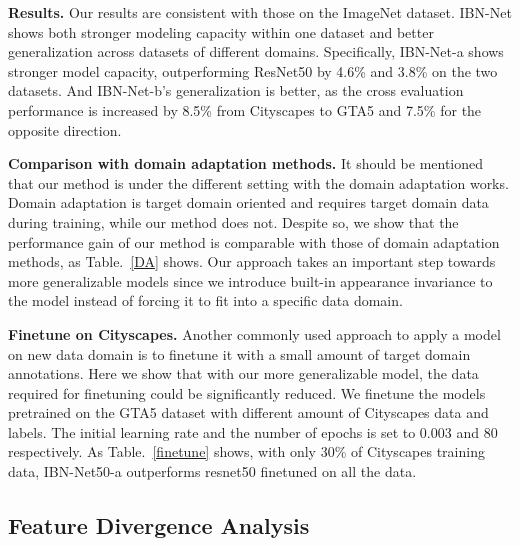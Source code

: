 \documentclass[runningheads]{llncs}
\begin{document}
\textbf{Results.} 
Our results are consistent with those on the ImageNet dataset.
IBN-Net shows both stronger modeling capacity within one dataset and better generalization across datasets of different domains.
Specifically, IBN-Net-a shows stronger model capacity, outperforming ResNet50 by 4.6\% and 3.8\% on the two datasets.
And IBN-Net-b's generalization is better, as the cross evaluation performance is increased by 8.5\% from Cityscapes to GTA5 and 7.5\% for the opposite direction.


\textbf{Comparison with domain adaptation methods.} It should be mentioned that our method is under the different setting with the domain adaptation works.
Domain adaptation is target domain oriented and requires target domain data during training, while our method does not.
Despite so, we show that the performance gain of our method is comparable with those of domain adaptation methods, as Table.~\ref{DA} shows.
Our approach takes an important step towards more generalizable models since we introduce built-in appearance invariance to the model instead of forcing it to fit into a specific data domain.

\textbf{Finetune on Cityscapes.} Another commonly used approach to apply a model on new data domain is to finetune it with a small amount of target domain annotations.
Here we show that with our more generalizable model, the data required for finetuning could be significantly reduced.
We finetune the models pretrained on the GTA5 dataset with different amount of Cityscapes data and labels.
The initial learning rate and the number of epochs is set to 0.003 and 80 respectively.
As Table.~\ref{finetune} shows, with only 30\% of Cityscapes training data, IBN-Net50-a outperforms resnet50 finetuned on all the data.

\subsection{Feature Divergence Analysis}
\end{document}
